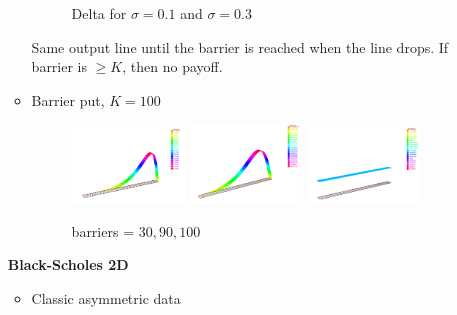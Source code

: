 \documentclass[a4paper]{report}
\begin{document}
\begin{itemize}
\begin{itemize}
\begin{figure}[H]
    \caption{ Delta for $\sigma=0.1$ and $\sigma=0.3$}
\end{figure}
Same output line until the barrier is reached when the line drops. If barrier is $\geq K$, then no payoff.
\item {Barrier put, $K=100$}
\begin{figure}[H]
   \includegraphics[width=0.300\textwidth]{b30.png}
   \hfill
   \includegraphics[width=0.300\textwidth]{b90.png}
	\hfill   
   \includegraphics[width=0.300\textwidth]{b100.png}
    \caption{ barriers = $30,90,100$}
\end{figure}


\end{itemize}


\textbf{Black-Scholes 2D}
\begin{itemize}
\item {Classic asymmetric data}




\end{itemize}
\end{itemize}
\end{document}
